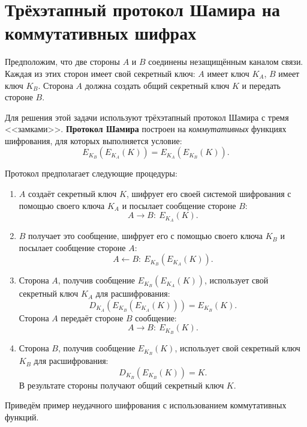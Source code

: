 \section[Трёхэтапный протокол Шамира]{Трёхэтапный протокол Шамира на коммутативных шифрах}

Предположим, что две стороны $A$ и $B$ соединены незащищённым каналом связи. Каждая из этих сторон имеет свой секретный ключ: $A$ имеет ключ $K_A$, $B$ имеет ключ $K_B$. Сторона $A$ должна создать общий секретный ключ $K$ и передать стороне $B$.

Для решения этой задачи используют трёхэтапный протокол Шамира с тремя <<замками>>. \textbf{Протокол Шамира} построен на \emph{коммутативных} функциях шифрования, для которых выполняется условие:
    \[ E_{K_{B}} (E_{K_{A}}(K))=E_{K_{A}} (E_{K_{B}}(K)). \]

Протокол предполагает следующие процедуры:
\begin{enumerate}
    \item $A$ создаёт секретный ключ $K$, шифрует его своей системой шифрования с помощью своего ключа $K_A$ и посылает сообщение стороне $B$:
        \[ A \rightarrow B: ~ E_{K_A}(K). \]
    \item $B$ получает это сообщение, шифрует его с помощью своего ключа $K_B$ и посылает сообщение стороне $A$:
        \[ A \leftarrow B: ~ E_{K_B}( E_{K_A}( K)). \]
    \item Сторона $A$, получив сообщение $E_{K_B}(E_{K_A}(K))$, использует свой секретный ключ $K_A$ для расшифрования:
            \[ D_{K_A}(E_{K_B} (E_{K_A}(K))) = E_{K_B}(K). \]
        Сторона $A$ передаёт стороне $B$ сообщение:
        \[ A \rightarrow B: ~ E_{K_B}(K). \]
    \item Сторона $B$, получив сообщение $E_{K_B}(K)$, использует свой секретный ключ $K_B$ для расшифрования:
            \[ D_{K_B}(E_{K_B}(K)) = K. \]
        В результате стороны получают общий секретный ключ $K$.
\end{enumerate}

Приведём пример неудачного шифрования с использованием коммутативных функций.

